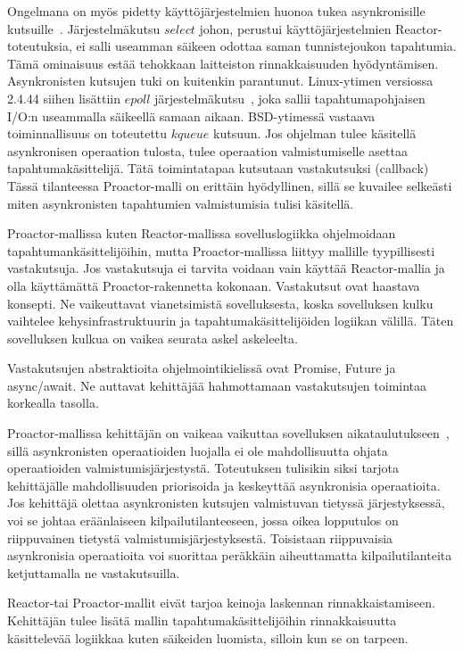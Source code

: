 \documentclass[finnish]{tktltiki2}
\theoremstyle{definition}
\theoremstyle{remark}
\begin{document}
Ongelmana on myös pidetty käyttöjärjestelmien huonoa
tukea asynkronisille kutsuille~\cite{pyarali_proactor_1997}. Järjestelmäkutsu
$select$ johon, perustui käyttöjärjestelmien Reactor-toteutuksia,
ei salli useamman säikeen odottaa saman tunnistejoukon tapahtumia.
Tämä ominaisuus estää tehokkaan laitteiston rinnakkaisuuden hyödyntämisen.
Asynkronisten kutsujen tuki on kuitenkin parantunut.
Linux-ytimen versiossa
2.4.44 siihen lisättiin $epoll$ järjestelmäkutsu~\cite{man_epoll}, joka
sallii tapahtumapohjaisen I/O:n useammalla säikeellä
samaan aikaan. BSD-ytimessä vastaava toiminnallisuus on toteutettu $kqueue$
kutsuun.
Jos ohjelman tulee käsitellä
asynkronisen operaation tulosta, tulee operaation valmistumiselle
asettaa tapahtumakäsittelijä. Tätä toimintatapaa kutsutaan vastakutsuksi (callback)
Tässä tilanteessa Proactor-malli on erittäin hyödyllinen, sillä se
kuvailee selkeästi miten asynkronisten tapahtumien valmistumisia tulisi käsitellä.

Proactor-mallissa kuten Reactor-mallissa sovelluslogiikka ohjelmoidaan
tapahtumankäsittelijöihin, mutta Proactor-mallissa liittyy
mallille tyypillisesti vastakutsuja. Jos vastakutsuja ei tarvita
voidaan vain käyttää Reactor-mallia ja olla käyttämättä Proactor-rakennetta kokonaan.
Vastakutsut ovat haastava konsepti. Ne vaikeuttavat vianetsimistä
sovelluksesta, koska sovelluksen kulku vaihtelee kehysinfrastruktuurin
ja tapahtumakäsittelijöiden logiikan välillä. Täten sovelluksen
kulkua on vaikea seurata askel askeleelta.

Vastakutsujen abstraktioita ohjelmointikielissä ovat Promise, Future ja
async/await. Ne auttavat kehittäjää hahmottamaan vastakutsujen
toimintaa korkealla tasolla.

Proactor-mallissa kehittäjän on vaikeaa vaikuttaa sovelluksen
aikataulutukseen~\cite{pyarali_proactor_1997},
sillä asynkronisten operaatioiden luojalla
ei ole mahdollisuutta ohjata operaatioiden valmistumisjärjestystä.
Toteutuksen tulisikin siksi tarjota kehittäjälle mahdollisuuden
priorisoida ja keskeyttää asynkronisia operaatioita.
Jos kehittäjä olettaa asynkronisten kutsujen valmistuvan tietyssä järjestyksessä,
voi se johtaa eräänlaiseen kilpailutilanteeseen, jossa
oikea lopputulos on riippuvainen tietystä valmistumisjärjestyksestä.
Toisistaan riippuvaisia asynkronisia operaatioita
voi suorittaa peräkkäin aiheuttamatta kilpailutilanteita ketjuttamalla ne
vastakutsuilla.

Reactor-tai Proactor-mallit eivät tarjoa keinoja
laskennan rinnakkaistamiseen. Kehittäjän tulee lisätä
mallin tapahtumakäsittelijöihin rinnakkaisuutta käsittelevää
logiikkaa kuten säikeiden luomista, silloin kun se on tarpeen.
\end{document}
